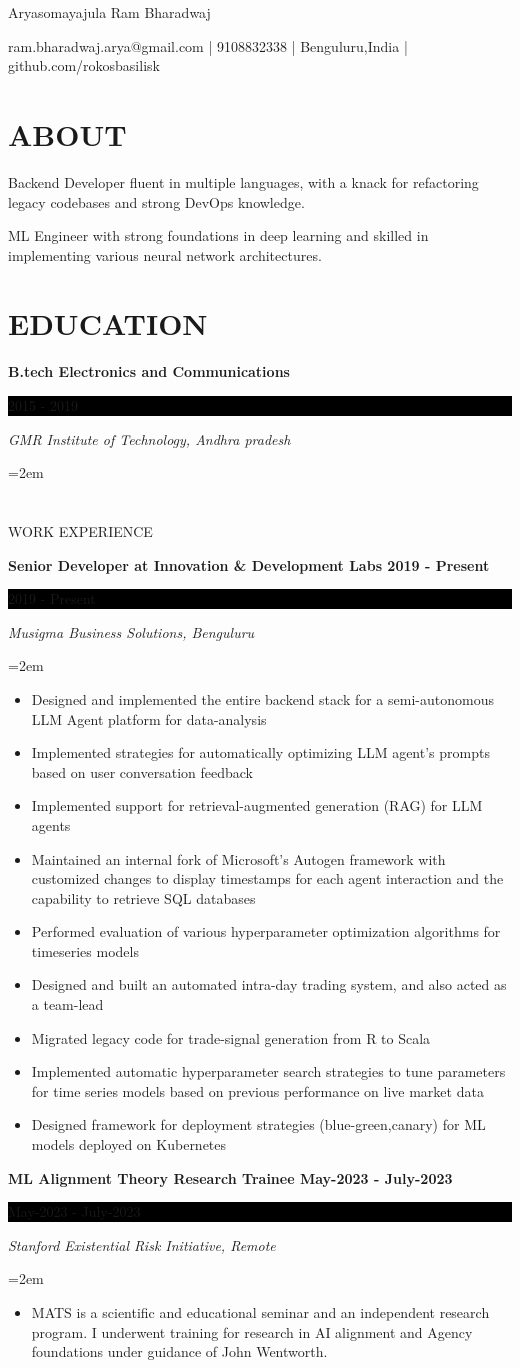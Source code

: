 \documentclass[fontsize=11pt]{article}
\newcommand{\sepspace}{\vspace*{1em}}   %
\newcommand{\MyName}[1]{ %
    \Huge \usefont{OT1}{phv}{b}{n} \hfill #1
    \par \normalsize \normalfont}
\newcommand{\NewPart}[1]{\section*{\uppercase{#1}}}
\newcommand{\EducationEntry}[4]{
    \noindent \textbf{#1} \hfill      %
    \colorbox{Black}{
      \parbox{8.5em}{
      \hfill\color{White}#2}} \par  %
    \noindent \textit{#3} \par        %
    \noindent\hangindent=2em\hangafter=0 \small #4 %
    \normalsize \par}
\newcommand{\WorkEntry}[4]{       %
    \noindent \textbf{#1} \hfill      %
    \colorbox{Black}{%
      \parbox{9em}{%
      \hfill\color{White}#2}} \par   %
        \noindent \textit{#3} \par        %
    \noindent\hangindent=2em\hangafter=0 \small #4 %
    \normalsize \par}
\newcommand{\AboutEntry}[1]{
    \noindent #1 \par}
\begin{document}
\MyName{Aryasomayajula Ram Bharadwaj}
\bigskip

{\small \hfill ram.bharadwaj.arya@gmail.com | 9108832338 | Benguluru,India | github.com/rokosbasilisk}

\NewPart{ABOUT}{}
\AboutEntry{Backend Developer fluent in multiple languages, with a knack for refactoring legacy codebases and strong DevOps knowledge.}
\AboutEntry{ML Engineer with strong foundations in deep learning and skilled in implementing various neural network architectures.}

\NewPart{EDUCATION}{}
\EducationEntry
{B.tech Electronics and Communications}
{2015 - 2019}
{GMR Institute of Technology, Andhra pradesh}

\NewPart{WORK EXPERIENCE}{}

\WorkEntry
{Senior Developer at Innovation \& Development Labs 2019 - Present}
{2019 - Present}
{Musigma Business Solutions, Benguluru}
{\begin{itemize} \itemsep -1pt
	\item Designed and implemented the entire backend stack for a semi-autonomous LLM Agent platform for data-analysis
	\item Implemented strategies for automatically optimizing LLM agent's prompts based on user conversation feedback
	\item Implemented support for retrieval-augmented generation (RAG) for LLM agents
	\item Maintained an internal fork of Microsoft's Autogen framework with customized changes to display timestamps for each agent interaction and the capability to retrieve SQL databases
	\item Performed evaluation of various hyperparameter optimization algorithms for timeseries models
	\item Designed and built an automated intra-day trading system, and also acted as a team-lead
	\item Migrated legacy code for trade-signal generation from R to Scala
	\item Implemented automatic hyperparameter search strategies to tune parameters for time series models based on previous performance on live market data
	\item Designed framework for deployment strategies (blue-green,canary) for ML models deployed on Kubernetes
	\end{itemize}}
\sepspace
\WorkEntry
{ML Alignment Theory Research Trainee May-2023 - July-2023}
{May-2023 - July-2023}
{Stanford Existential Risk Initiative, Remote}
{\begin{itemize} \itemsep -1pt
	\item MATS is a scientific and educational seminar and an independent research program. I underwent training for research in AI alignment and Agency foundations under guidance of John Wentworth.
	\end{itemize}}
\end{document}
